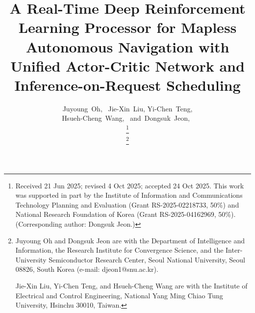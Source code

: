 
\documentclass[letter,journal]{IEEEtran}

\usepackage{xcolor,soul,framed} %

\usepackage[pdftex]{graphicx}
\graphicspath{{../pdf/}{../jpeg/}}

\usepackage[cmex10]{amsmath}
\usepackage{array}
\usepackage{mdwmath}
\usepackage{mdwtab}
\usepackage{eqparbox}
\usepackage{url}



\usepackage{multicol}
\usepackage{multirow}
\usepackage{array}
\usepackage{bm} %
\usepackage{tabularx}
\usepackage[caption=false,font=footnotesize]{subfig}
\usepackage{cite}
\usepackage{hhline}
\usepackage{tikz}

\usepackage{makecell}
\usepackage{caption}
\usepackage{threeparttable}



    \title{A Real-Time Deep Reinforcement Learning Processor for Mapless Autonomous Navigation with Unified Actor-Critic Network and Inference-on-Request Scheduling}
  \author{Juyoung~Oh,~
      Jie-Xin~Liu,
      Yi-Chen~Teng,\\
      Hsueh-Cheng~Wang,~
      and~Dongsuk~Jeon,~%

  \thanks{Received 21 Jun 2025; revised 4 Oct 2025; accepted 24 Oct 2025. This work was supported in part by the Institute of Information and Communications Technology Planning and Evaluation (Grant RS-2025-02218733, 50\%) and National Research Foundation of Korea (Grant RS-2025-04162969, 50\%). (Corresponding author: Dongsuk Jeon.)}

  \thanks{Juyoung Oh and Dongsuk Jeon are with the Department of Intelligence and Information, the Research Institute for Convergence Science, and the Inter-University Semiconductor Research Center, Seoul National University, Seoul 08826, South Korea (e-mail: djeon1@snu.ac.kr).

  Jie-Xin Liu, Yi-Chen Teng, and Hsueh-Cheng Wang are with the Institute of Electrical and Control Engineering, National Yang Ming Chiao Tung University, Hsinchu 30010, Taiwan.
  }%
  }

